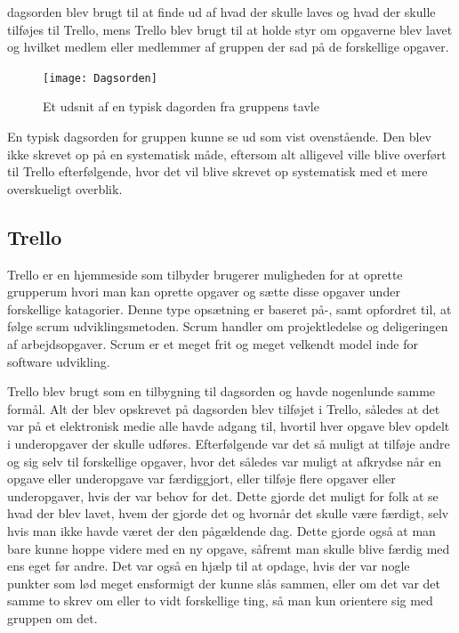 dagsorden blev brugt til at finde ud af hvad der skulle laves og hvad der skulle tilføjes til Trello, mens Trello blev brugt til at holde styr om opgaverne blev lavet og hvilket medlem eller medlemmer af gruppen der sad på de forskellige opgaver.

\begin{figure}[h]
\texttt{[image: Dagsorden]}
\centering
\caption{Et udsnit af en typisk dagorden fra gruppens tavle}\label{Dagsorden}
\end{figure}


En typisk dagsorden for gruppen kunne se ud som vist ovenstående. Den blev ikke skrevet op på en systematisk måde, eftersom alt alligevel ville blive overført til Trello efterfølgende, hvor det vil blive skrevet op systematisk med et mere overskueligt overblik.

\subsection*{Trello}\label{Trello}
Trello er en hjemmeside som tilbyder brugerer muligheden for at oprette grupperum hvori man kan oprette opgaver og sætte disse opgaver under forskellige katagorier. Denne type opsætning er baseret på-, samt opfordret til, at følge scrum udviklingsmetoden. Scrum handler om projektledelse og deligeringen af arbejdsopgaver. Scrum er et meget frit og meget velkendt model inde for software udvikling.

Trello blev brugt som en tilbygning til dagsorden og havde nogenlunde samme formål. Alt der blev opskrevet på dagsorden blev tilføjet i Trello, således at det var på et elektronisk medie alle havde adgang til, hvortil hver opgave blev opdelt i underopgaver der skulle udføres. Efterfølgende var det så muligt at tilføje andre og sig selv til forskellige opgaver, hvor det således var muligt at afkrydse når en opgave eller underopgave var færdiggjort, eller tilføje flere  opgaver eller underopgaver, hvis der var behov for det. Dette gjorde det muligt for folk at se hvad der blev lavet, hvem der gjorde det og hvornår det skulle være færdigt, selv hvis man ikke havde været der den pågældende dag. Dette gjorde også at man bare kunne hoppe videre med en ny opgave, såfremt man skulle blive færdig med ens eget før andre. Det var også en hjælp til at opdage, hvis der var nogle punkter som lød meget ensformigt der kunne slås sammen, eller om det var det samme to skrev om eller to vidt forskellige ting, så man kun orientere sig med gruppen om det. 

